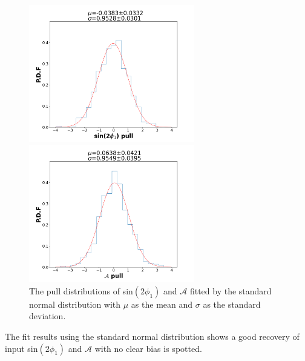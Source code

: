 \begin{figure}[H]
	\begin{minipage}{0.5\linewidth}
		\includegraphics[height=6cm]{figures/pull_hist_S}
	\end{minipage}
	\begin{minipage}{0.5\linewidth}
		\includegraphics[height=6cm]{figures/pull_hist_A}
	\end{minipage}
	\caption{The pull distributions of sin$(2\phi_1)$ and $\mathcal{A}$ fitted by the standard normal distribution with $\mu$ as the mean and $\sigma$ as the standard deviation. }
\end{figure}

The fit results using the standard normal distribution shows a good recovery of input sin$(2\phi_1)$ and $\mathcal{A}$ with no clear bias is spotted.


